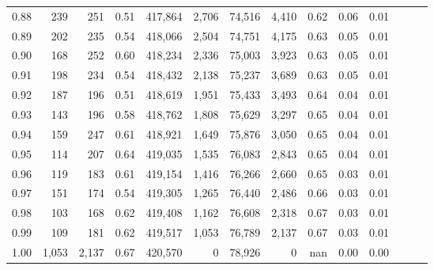 \begin{tabular}{rrrrrrrrrrrrrr}
0.88 &     239 &    251 &  0.51 &  417,864 &    2,706 &  74,516 &   4,410 &  0.62 &  0.06 &      0.01 \\
0.89 &     202 &    235 &  0.54 &  418,066 &    2,504 &  74,751 &   4,175 &  0.63 &  0.05 &      0.01 \\
0.90 &     168 &    252 &  0.60 &  418,234 &    2,336 &  75,003 &   3,923 &  0.63 &  0.05 &      0.01 \\
0.91 &     198 &    234 &  0.54 &  418,432 &    2,138 &  75,237 &   3,689 &  0.63 &  0.05 &      0.01 \\
0.92 &     187 &    196 &  0.51 &  418,619 &    1,951 &  75,433 &   3,493 &  0.64 &  0.04 &      0.01 \\
0.93 &     143 &    196 &  0.58 &  418,762 &    1,808 &  75,629 &   3,297 &  0.65 &  0.04 &      0.01 \\
0.94 &     159 &    247 &  0.61 &  418,921 &    1,649 &  75,876 &   3,050 &  0.65 &  0.04 &      0.01 \\
0.95 &     114 &    207 &  0.64 &  419,035 &    1,535 &  76,083 &   2,843 &  0.65 &  0.04 &      0.01 \\
0.96 &     119 &    183 &  0.61 &  419,154 &    1,416 &  76,266 &   2,660 &  0.65 &  0.03 &      0.01 \\
0.97 &     151 &    174 &  0.54 &  419,305 &    1,265 &  76,440 &   2,486 &  0.66 &  0.03 &      0.01 \\
0.98 &     103 &    168 &  0.62 &  419,408 &    1,162 &  76,608 &   2,318 &  0.67 &  0.03 &      0.01 \\
0.99 &     109 &    181 &  0.62 &  419,517 &    1,053 &  76,789 &   2,137 &  0.67 &  0.03 &      0.01 \\
1.00 &   1,053 &  2,137 &  0.67 &  420,570 &        0 &  78,926 &       0 &   nan &  0.00 &      0.00 \\
\bottomrule
\end{tabular}
